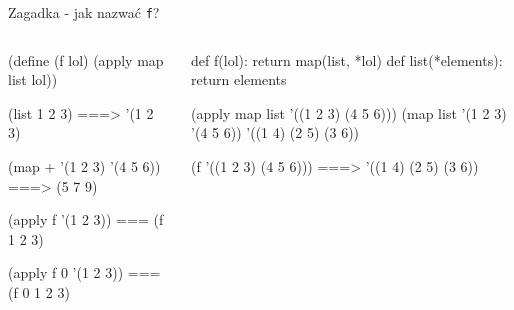 \documentclass{beamer}
\newenvironment{Snippet}{\Verbatim[samepage=true,fontsize=\footnotesize]}{\endVerbatim}
\begin{document}
\begin{frame}[fragile]{Zagadka - jak nazwać \texttt{f}?}
  \begin{columns}[T] %
    \begin{column}{.38\textwidth}
  
      \begin{Snippet}
(define (f lol)
  (apply map list lol))
      \end{Snippet}
      \pause

      \begin{Snippet}
(list 1 2 3) ===> '(1 2 3)
      \end{Snippet}
      \pause

       \begin{Snippet}
(map + '(1 2 3) '(4 5 6))
   ===> (5 7 9)
      \end{Snippet}
      \pause

      \begin{Snippet}
(apply f '(1 2 3))
 === (f 1 2 3)
      \end{Snippet}
      \pause

      \begin{Snippet}
(apply f 0 '(1 2 3))
 === (f 0 1 2 3)
      \end{Snippet}
      \pause

    \end{column}%
    \hfill%
    \begin{column}{.58\textwidth}
      \begin{Snippet}
def f(lol):
    return map(list, *lol)
      \end{Snippet}
      \pause
      \begin{Snippet}
def list(*elements):
    return elements
      \end{Snippet}
      \pause

      \begin{Snippet}
(apply map list '((1 2 3)
                  (4 5 6)))
      \end{Snippet}
      \pause
      \begin{Snippet}
(map list '(1 2 3) '(4 5 6))
      \end{Snippet}
      \pause
      \begin{Snippet}
'((1 4)
  (2 5)
  (3 6))
      \end{Snippet}

      \pause
      \begin{Snippet}
(f '((1 2 3)
     (4 5 6))) ===> '((1 4)
                      (2 5)
                      (3 6))
      \end{Snippet}
      
    \end{column}%
  \end{columns} 
  
\end{frame}
\end{document}
